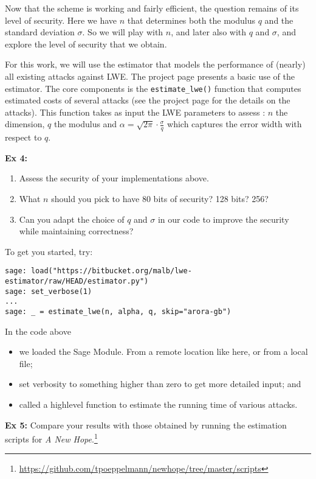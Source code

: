 \documentclass[10pt,a4paper,nobib]{tufte-handout}
\begin{document}
Now that the scheme is working and fairly efficient, the question remains of its level of security. Here we have $n$ that determines both the modulus $q$ and the standard deviation $\sigma$. So we will play with $n$, and later also with $q$ and $\sigma$, and explore the level of security that we obtain.

For this work, we will use the estimator that models the performance of (nearly) all existing attacks against LWE\@. The project page presents a basic use of the estimator. The core components is the \texttt{estimate\_lwe()} function that computes estimated costs of several attacks (see the project page for the details on the attacks). This function takes as input the LWE parameters to assess : $n$ the dimension, $q$ the modulus and $\alpha = \sqrt{2\pi}\cdot \frac{\sigma}{q}$ which captures the error width with respect to $q$. 

\textbf{Ex 4:}
\begin{enumerate}
  \item Assess the security of your implementations above.
  \item What $n$ should you pick to have 80 bits of security? 128 bits? 256?
  \item Can you adapt the choice of $q$ and $\sigma$ in our code to improve the security while maintaining correctness?
\end{enumerate}

To get you started, try:

\lstset{language=sage,label= ,caption= ,captionpos=b,numbers=none}
\begin{lstlisting}
sage: load("https://bitbucket.org/malb/lwe-estimator/raw/HEAD/estimator.py")
sage: set_verbose(1)
...
sage: _ = estimate_lwe(n, alpha, q, skip="arora-gb")
\end{lstlisting}

In the code above

\begin{itemize}
\item we loaded the Sage Module. From a remote location like here, or from a local file;
\item set verbosity to something higher than zero to get more detailed input; and
\item called a highlevel function to estimate the running time of various attacks.
\end{itemize}

\textbf{Ex 5:} Compare your results with those obtained by running the estimation scripts for \emph{A New Hope}.\footnote{\url{https://github.com/tpoeppelmann/newhope/tree/master/scripts}}
\end{document}
